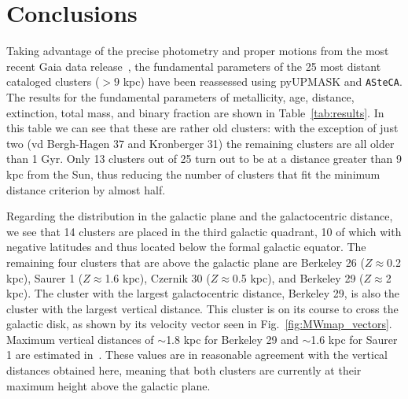 \documentclass{aa}
\begin{document}
\section{Conclusions}
 \label{sec:conclusions}

  Taking advantage of the precise photometry and proper motions from the
  most recent Gaia data release~\citep{Gaia_EDR3}, the fundamental parameters
  of the 25 most distant cataloged clusters ($>9$ kpc) have been
  reassessed using pyUPMASK and \texttt{ASteCA}.
  The results for the fundamental parameters of metallicity, age, distance,
  extinction, total mass, and binary fraction are shown in 
  Table~\ref{tab:results}. In this table we can see that these are
  rather old clusters: with the exception of just two (vd Bergh-Hagen 37 and
  Kronberger 31) the remaining clusters are all older than 1 Gyr.
  Only 13 clusters out of 25 turn out to be at a distance greater
  than 9 kpc from the Sun, thus reducing the number of clusters that fit the
  minimum distance criterion by almost half.

  Regarding the distribution in the galactic plane and the galactocentric
  distance, we see that 14 clusters are placed in the third galactic
  quadrant, 10 of which with negative latitudes and thus located below
  the formal galactic equator. The remaining four clusters that are above the
  galactic plane are Berkeley 26 ($Z\approx$0.2 kpc), Saurer 1
  ($Z\approx$1.6 kpc), Czernik 30 ($Z\approx$0.5 kpc), and Berkeley
  29 ($Z\approx$2 kpc). The cluster with the largest galactocentric distance,
  Berkeley 29, is also the cluster with the largest vertical distance. This
  cluster is on its course to cross the galactic disk, as shown by its velocity
  vector seen in Fig.~\ref{fig:MWmap_vectors}. Maximum vertical distances
  of $\sim$1.8 kpc for Berkeley 29 and $\sim$1.6 kpc for Saurer 1 are estimated
  in~\cite{Gaia_Collaboration_2021}. These values are in reasonable agreement with the
  vertical distances obtained here, meaning that both clusters are currently at
  their maximum height above the galactic plane.
\end{document}
